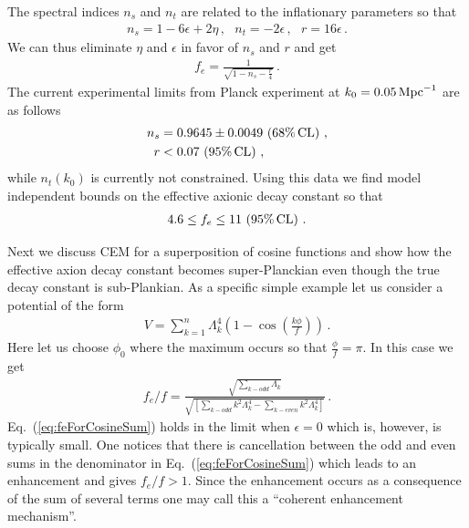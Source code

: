 \documentclass[12pt]{article}
\begin{document}
The spectral indices $n_s$ and $n_t$ are related to the inflationary parameters so that
\begin{align} \label{eq:observablesSlowRoll}
  n_s = 1 - 6 \epsilon + 2 \eta\,,
  ~~~ n_t = -2 \epsilon\,,
  ~~~ r = 16 \epsilon\,.
\end{align}
We can thus eliminate $\eta$ and $\epsilon$ in favor of $n_s$ and $r$ and get
\begin{align}
  f_e = \frac{1}{\sqrt{1 - n_s - \frac{r}{4}}}\,.
\end{align}
The current experimental limits from Planck experiment at $k_0 = 0.05\,{\rm Mpc}^{-1}$ are as follows~\cite{Adam:2015rua, Ade:2015lrj, Array:2015xqh}
\begin{align} \label{data}
  n_s &= 0.9645 \pm 0.0049\, \left(68\%\, {\rm CL}\right)\,,\nonumber\\
    r &< 0.07\, \left(95\%\, {\rm CL}\right)\,,
\end{align}
while $n_t\left(k_0\right)$ is currently not constrained.
Using this data we find model independent bounds on the effective axionic decay constant so that
\begin{align}
  4.6 \leq f_e \leq 11\, \left(95\%\, {\rm CL}\right)\,.
\end{align}

Next we discuss CEM for a superposition of cosine functions and show how the effective axion decay constant becomes super-Planckian even though the true decay constant is sub-Plankian.
As a specific simple example let us consider a potential of the form
\begin{align} \label{eq:cosineSumPotential}
  V = \sum_{k = 1}^n \Lambda_k^4 \left(1 - \cos\left(\frac{k\phi}{f}\right)\right)\,.
\end{align}
Here let us choose $\phi_0$ where the maximum occurs so that $\frac{\phi}{f} = \pi$.
In this case we get
\begin{align} \label{eq:feForCosineSum}
  {f_e} / f = \frac
    {\sqrt{\sum_{k - odd} \Lambda_k}}
    {\sqrt{\left[\sum_{k - odd} k^2 \Lambda_k^4 - \sum_{k - even} k^2 \Lambda_k^4\right]}}\,.
\end{align}
Eq.~(\ref{eq:feForCosineSum}) holds in the limit when $\epsilon = 0$ which is, however, is typically small.
One notices that there is cancellation between the odd and even sums in the denominator in Eq.~(\ref{eq:feForCosineSum}) which leads to an enhancement and gives $f_e / f > 1$.
Since the enhancement occurs as a consequence of the sum of several terms one may call this a ``coherent enhancement mechanism''.
\end{document}
